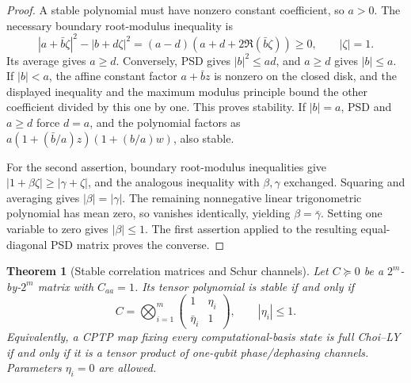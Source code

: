 \documentclass[reqno]{amsart}
\newtheorem{theorem}{Theorem}[section]
\theoremstyle{definition}
\theoremstyle{remark}
\begin{document}
\begin{proof}
A stable polynomial must have nonzero constant coefficient, so
\(a>0\).  The necessary boundary root-modulus inequality is
\[
 |a+\bar b\zeta|^2-|b+d\zeta|^2
 =(a-d)(a+d+2\Re(\bar b\zeta))\ge0,
 \qquad |\zeta|=1.
\]
Its average gives \(a\ge d\).  Conversely, PSD gives
\(|b|^2\le ad\), and \(a\ge d\) gives \(|b|\le a\).
If \(|b|<a\), the affine constant factor \(a+\bar b z\)
is nonzero on the closed disk, and the displayed inequality
and the maximum modulus principle bound the other coefficient
divided by this one by one.  This proves stability.  If
\(|b|=a\), PSD and \(a\ge d\) force \(d=a\), and the
polynomial factors as
\(a(1+(\bar b/a)z)(1+(b/a)w)\), also stable.

For the second assertion, boundary root-modulus inequalities give
\(|1+\beta\zeta|\ge|\gamma+\zeta|\), and the analogous
inequality with \(\beta,\gamma\) exchanged.  Squaring and
averaging gives \(|\beta|=|\gamma|\).  The remaining nonnegative
linear trigonometric polynomial has mean zero, so vanishes
identically, yielding \(\beta=\bar\gamma\).  Setting one
variable to zero gives \(|\beta|\le1\).  The first assertion
applied to the resulting equal-diagonal PSD matrix proves the
converse.
\end{proof}

\begin{theorem}[Stable correlation matrices and Schur channels]
\label{stat:schur}
Let \(C\succeq0\) be a \(2^m\)-by-\(2^m\) matrix with
\(C_{aa}=1\).  Its tensor polynomial is stable if and only if
\begin{equation}
 C=\bigotimes_{i=1}^m
 \begin{pmatrix}1&\eta_i\\\bar\eta_i&1\end{pmatrix},
 \qquad |\eta_i|\le1.
 \label{stat:correlation-product}
\end{equation}
Equivalently, a CPTP map fixing every computational-basis state is
full Choi--LY if and only if it is a tensor product of one-qubit
phase/dephasing channels.  Parameters \(\eta_i=0\) are allowed.
\end{theorem}
\end{document}

